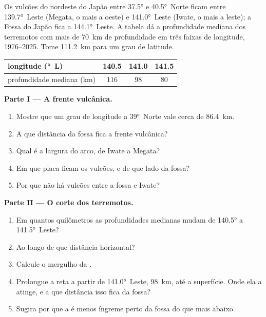 \begin{problem}
\label{pb:g12:subduction-magmatism:1}
Os vulcões do nordeste do Japão entre \ang{37.5} e \ang{40.5}~Norte ficam
entre \ang{139.7}~Leste (Megata, o mais a oeste) e \ang{141.0}~Leste (Iwate,
o mais a leste); a Fossa do Japão fica a \ang{144.1}~Leste. A tabela dá a
profundidade mediana dos terremotos com mais de \qty{70}{km} de
profundidade em três faixas de longitude, 1976--2025. Tome \qty{111.2}{km}
para um grau de latitude.

\begin{center}
\small
\begin{tabular}{|l|c|c|c|}
\hline
longitude (\unit{\degree}~L) & 140.5 & 141.0 & 141.5 \\ \hline
profundidade mediana (\unit{km}) & 116 & 98 & 80 \\ \hline
\end{tabular}
\end{center}

\medskip
\noindent\textbf{Parte I --- A frente vulcânica.}
\begin{enumerate}
  \item Mostre que um grau de longitude a \ang{39}~Norte vale cerca de
        \qty{86.4}{km}.
  \item A que distância da fossa fica a frente vulcânica?
  \item Qual é a largura do arco, de Iwate a Megata?
  \item Em que placa ficam os vulcões, e de que lado da fossa?
  \item Por que não há vulcões entre a fossa e Iwate?
\end{enumerate}

\medskip
\noindent\textbf{Parte II --- O corte dos terremotos.}
\begin{enumerate}[resume]
  \item Em quantos quilômetros as profundidades medianas mudam de
        \ang{140.5} a \ang{141.5}~Leste?
  \item Ao longo de que distância horizontal?
  \item Calcule o mergulho da .
  \item Prolongue a reta a partir de \ang{141.0}~Leste, \qty{98}{km}, até a
        superfície. Onde ela a atinge, e a que distância isso fica da fossa?
  \item Sugira por que a  é menos íngreme perto da fossa do que mais
        abaixo.
\end{enumerate}


\end{problem}
